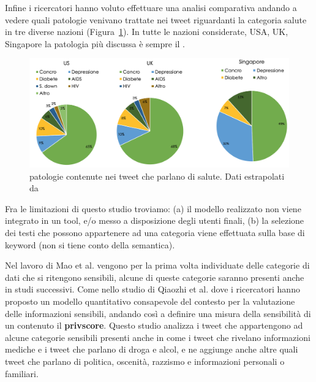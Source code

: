 Infine i ricercatori hanno voluto effettuare una analisi comparativa andando a vedere quali patologie venivano trattate nei tweet riguardanti la categoria salute in tre diverse nazioni (Figura~\ref{fig:res-patologie-nazioni}). In tutte le nazioni considerate, USA, UK, Singapore la patologia più discussa è sempre il .

\begin{figure}[h!t]
    \centering
    \includegraphics[width=15cm]{Figure/related_work/nazioni.png}
    \caption{patologie contenute nei tweet che parlano di salute. Dati estrapolati da\cite{looseTweets}}
    \label{fig:res-patologie-nazioni}
\end{figure}
\FloatBarrier


Fra le limitazioni di questo studio troviamo: (a) il modello realizzato non viene integrato in un tool, e/o messo a disposizione degli utenti finali, (b) la selezione dei testi che possono appartenere ad una categoria viene effettuata sulla base di keyword (non si tiene conto della semantica).

Nel lavoro di Mao et al.\cite{looseTweet} vengono per la prima volta individuate delle categorie di dati che si ritengono sensibili, alcune di queste categorie saranno presenti anche in studi successivi. Come nello studio di Qiaozhi et al.\cite{dontTweetThis} dove i ricercatori hanno proposto un modello quantitativo consapevole del contesto per la valutazione delle informazioni sensibili, andando così a definire una misura della sensibilità di un contenuto il \textbf{privscore}. Questo studio analizza i tweet che appartengono ad alcune categorie sensibili presenti anche in\cite{looseTweet} come i tweet che rivelano informazioni mediche e i tweet che parlano di droga e alcol, e ne aggiunge anche altre quali tweet che parlano di politica, oscenità, razzismo e informazioni personali o familiari.

